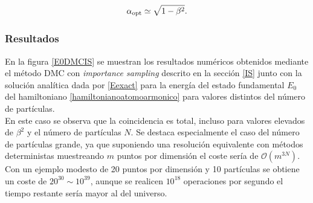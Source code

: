 \documentclass[11pt,a4paper,twoside,pdf]{article}
\numberwithin{equation}{section}
\begin{document}
\begin{equation}
\alpha_{\rm opt} \simeq \sqrt{1-\beta^2}.
\end{equation}


\newpage
\subsubsection{Resultados}


En la figura \ref{E0DMCIS} se muestran los resultados numéricos obtenidos mediante el método DMC con \textit{importance sampling} descrito en la sección \ref{IS} junto con la solución analítica dada por \ref{Eexact} para la energía del estado fundamental $E_0$ del hamiltoniano \ref{hamiltonianoatomoarmonico} para valores distintos del número de partículas.\\


En este caso se observa que la coincidencia es total, incluso para valores elevados de $\beta^2$ y el número de partículas $N$. Se destaca especialmente el caso del número de partículas grande, ya que suponiendo una resolución equivalente con métodos deterministas muestreando $m$ puntos por dimensión el coste sería de $\mathcal{O}(m^{3N})$. Con un ejemplo modesto de 20 puntos por dimensión y 10 partículas se obtiene un coste de $20^{30} \sim 10^{39}$, aunque se realicen $10^{18}$ operaciones por segundo el tiempo restante sería mayor al del universo.
\end{document}
